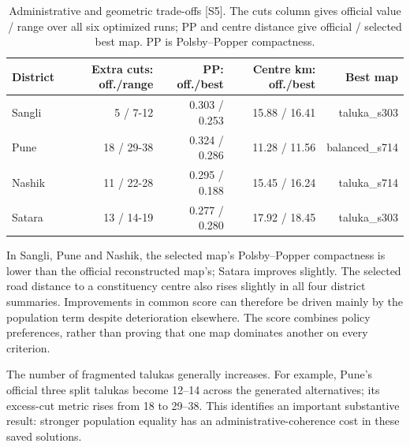\documentclass[11pt,a4paper,oneside]{report}
\newcommand{\source}[1]{\par\nopagebreak[4]{\footnotesize\color{teal}Evidence: #1.}\par}
\begin{document}
\begin{table}[htbp]\centering
\small
\setlength{\tabcolsep}{5pt}
\caption{Administrative and geometric trade-offs [S5]. The cuts column gives official value / range over all six optimized runs; PP and centre distance give official / selected best map. PP is Polsby--Popper compactness.}
\begin{tabular}{lrrrr}
\toprule
District & Extra cuts: off./range & PP: off./best & Centre km: off./best & Best map\\
\midrule
Sangli & 5 / 7-12 & 0.303 / 0.253 & 15.88 / 16.41 & taluka\_s303\\
Pune & 18 / 29-38 & 0.324 / 0.286 & 11.28 / 11.56 & balanced\_s714\\
Nashik & 11 / 22-28 & 0.295 / 0.188 & 15.45 / 16.24 & taluka\_s714\\
Satara & 13 / 14-19 & 0.277 / 0.280 & 17.92 / 18.45 & taluka\_s303\\
\bottomrule\end{tabular}
\end{table}
In Sangli, Pune and Nashik, the selected map's Polsby--Popper compactness is lower than the official reconstructed map's; Satara improves slightly. The selected road distance to a constituency centre also rises slightly in all four district summaries. Improvements in common score can therefore be driven mainly by the population term despite deterioration elsewhere. The score combines policy preferences, rather than proving that one map dominates another on every criterion.

The number of fragmented talukas generally increases. For example, Pune's official three split talukas become 12--14 across the generated alternatives; its excess-cut metric rises from 18 to 29--38. This identifies an important substantive result: stronger population equality has an administrative-coherence cost in these saved solutions.
\source{[S5]}
\end{document}
